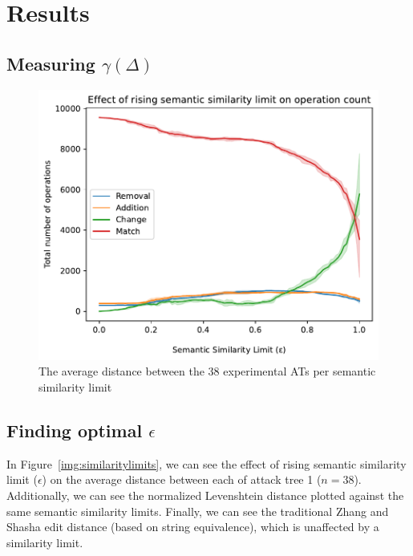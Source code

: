 \section{Results}
\label{sec:results}



\subsection{Measuring $\gamma(\Delta)$}


\begin{figure}
    \includegraphics[width=\linewidth]{code/img/operation_count.pdf}
    \caption{The average distance between the 38 experimental ATs per semantic similarity limit}
    \label{img:operation-count}
\end{figure}

\subsection{Finding optimal $\epsilon$}

In Figure~\ref{img:similaritylimits}, we can see the effect of rising semantic similarity limit ($\epsilon$) on the average distance between each of attack tree 1 ($n=38$). Additionally, we can see the normalized Levenshtein distance plotted against the same semantic similarity limits. Finally, we can see the traditional Zhang and Shasha edit distance (based on string equivalence), which is unaffected by a similarity limit.

